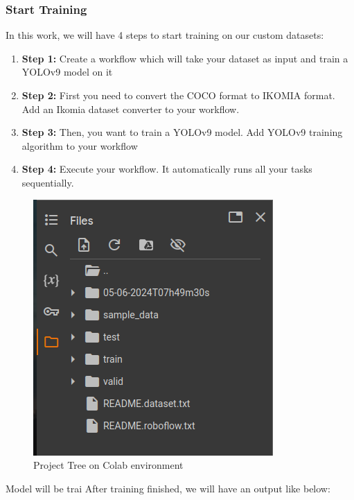         \subsubsection{Start Training}
            In this work, we will have 4 steps to start training on our custom datasets:
            \begin{enumerate}
                \item \textbf{Step 1:} Create a workflow which will take your dataset as input and train a YOLOv9 model on it
                \item \textbf{Step 2:} First you need to convert the COCO format to IKOMIA format. Add an Ikomia dataset converter to your workflow.
                \item \textbf{Step 3:} Then, you want to train a YOLOv9 model. Add YOLOv9 training algorithm to your workflow
                \item \textbf{Step 4:} Execute your workflow. It automatically runs all your tasks sequentially.
            \end{enumerate}
            \begin{figure}[H]
                \centering
                \includegraphics[width=0.8\linewidth]{img/project_tree.png}
                \caption{Project Tree on Colab environment}
                \label{fig:tree}
            \end{figure}
            Model will be trai
            After training finished, we will have an output like below:
